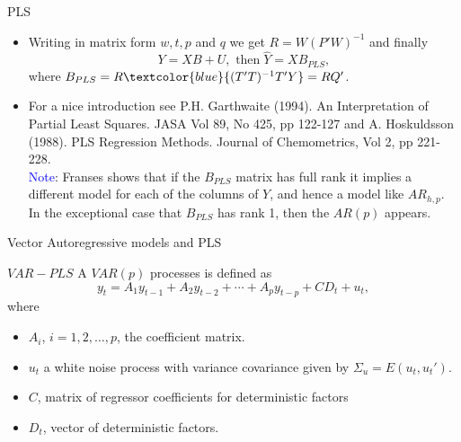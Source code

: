 \documentclass{beamer}
\newcommand{\?}{?`}
\begin{document}
\begin{frame}{PLS}
  \begin{itemize}
  \item Writing in matrix form $w,t,p$ and $q$ we get $R=W(P'W)^{-1}$ and
   finally
    \begin{displaymath}
      Y=XB+U, \text{ then} \; \hat{Y}=XB_{PLS},
    \end{displaymath}
    where $B_{PLS}=R\textcolor{blue}{(T'T)^{-1}T'Y}=RQ'$.
  \item     \bigskip

    For a nice introduction see P.H. Garthwaite
    (1994). An Interpretation of Partial Least Squares. JASA Vol 89,
    No 425, pp 122-127 and A. Hoskuldsson (1988). PLS Regression Methods. Journal of
    Chemometrics, Vol 2, pp 221-228.\\
    \medskip
    \textcolor{blue}{Note}: Franses shows that if  the $B_{PLS}$ matrix has full rank it implies a different model for
each of the columns of $Y$, and hence a model like $AR_{h,p}$. In the exceptional case that
$B_{PLS}$ has rank 1, then the $AR(p)$ appears.
  \end{itemize}
\end{frame}

\begin{frame}{}
  \begin{block}{}
    \begin{center}
      \vspace{3mm}
      {\Large Vector Autoregressive models and PLS}
      \vspace{3mm}
    \end{center}
  \end{block}
\end{frame}

\begin{frame}{$VAR-PLS$}
  A $VAR(p)$ processes is defined as
    \begin{displaymath}
      y_t=A_1y_{t-1} + A_2y_{t-2} + \cdots + A_py_{t-p} + CD_t + u_t,
    \end{displaymath}
  where
    \begin{itemize}
    \item $A_i$, $i=1,2,\ldots, p$, the coefficient matrix.
    \item $u_t$ a white noise process
     with variance covariance given by $\Sigma_u=E(u_t,u_t')$.
    \item $C$,  matrix of regressor coefficients for deterministic factors
    \item $D_t$, vector of deterministic factors.
    \end{itemize}
\end{frame}
\end{document}
